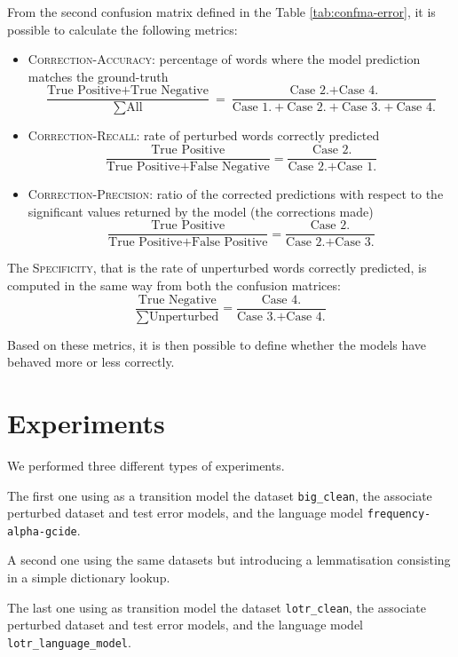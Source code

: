 From the second confusion matrix defined in the Table \ref{tab:confma-error}, it is possible to calculate the 
following metrics:
\begin{itemize}
	\item \textsc{Correction-Accuracy}: percentage of words where the model prediction matches the 
	ground-truth  
	\[ \frac{\mbox{True Positive} + \mbox{True Negative}}{\sum \mbox{All}} = \frac{\mbox{Case 2.} + \mbox{Case 
	4.}}{\mbox{Case 1.} + \mbox{Case 2.} + \mbox{Case 3.} + \mbox{Case 4.}}\]
	\item \textsc{Correction-Recall}: rate of perturbed words correctly predicted
\[ \frac{\mbox{True Positive}}{\mbox{True Positive} + \mbox{False Negative}} = \frac{\mbox{Case 
		2.}}{\mbox{Case 2.} + \mbox{Case 1.}}\]
	\item \textsc{Correction-Precision}: ratio of the corrected predictions with respect to the significant values 
	returned by the 
	model (the corrections made) 
		\[ \frac{\mbox{True Positive}}{\mbox{True Positive} + \mbox{False Positive}} = \frac{\mbox{Case 
		2.}}{\mbox{Case 2.} + \mbox{Case 3.}}\]
\end{itemize}

The \textsc{Specificity}, that is the rate of unperturbed words correctly predicted, is computed in the same way 
from both the confusion matrices:
\[ \frac{\mbox{True Negative}}{\sum \mbox{Unperturbed}} = \frac{\mbox{Case 4.}}{\mbox{Case 3.} + 
	\mbox{Case 4.}}\]


Based on these metrics, it is then possible to define whether the models have behaved more or less correctly.

\section{Experiments}
We performed three different types of experiments.

The first one using as a transition model the dataset \texttt{big\_clean}, the associate perturbed dataset and test error 
models, and the language model \texttt{frequency-alpha-gcide}.

A second one using the same datasets but introducing a lemmatisation consisting in a simple dictionary lookup.

The last one using as transition model the dataset \texttt{lotr\_clean}, the associate perturbed dataset and test error 
models, and the language model \texttt{lotr\_language\_model}.\\

